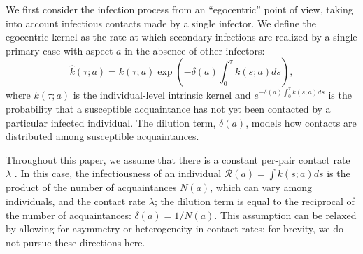 \documentclass[12pt]{article}
\newcommand{\RR}{\ensuremath{{\mathcal R}}}
\begin{document}
We first consider the infection process from an ``egocentric'' point of view, taking into account infectious contacts made by a single infector.
We define the egocentric kernel as the rate at which secondary infections are realized by a single primary case with aspect $a$ in the absence of other infectors:
\begin{equation}
\hat{k}(\tau; a) = k(\tau; a) \exp \left(- \delta(a) \int_0^\tau k(s; a) ds\right),
\end{equation}
where $k(\tau; a)$ is the individual-level intrinsic kernel and $e^{- \delta(a) \int_0^\tau k(s; a) ds}$ is the probability that a susceptible acquaintance has not yet been contacted by a particular infected individual.
The dilution term, $\delta(a)$, models how contacts are distributed among susceptible acquaintances.

Throughout this paper, we assume that there is a constant per-pair contact rate $\lambda$ \cite{trapman2016inferring}.
In this case, the infectiousness of an individual $\RR(a) = \int k(s; a) ds$ is the product of the number of acquaintances $N(a)$, which can vary among individuals, and the contact rate $\lambda$; the dilution term is equal to the reciprocal of the number of acquaintances: $\delta(a) = 1/N(a)$.
This assumption can be relaxed by allowing for asymmetry \citep{trapman2016inferring} or heterogeneity \citep{ball1997epidemics, ball2002general} in contact rates; 
for brevity, we do not pursue these directions here.
\end{document}
